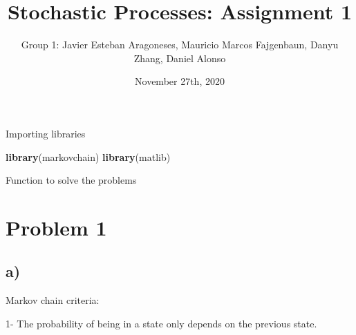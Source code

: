 \documentclass[]{article}
\title{Stochastic Processes: Assignment 1}
\author{Group 1: Javier Esteban Aragoneses, Mauricio Marcos Fajgenbaun, Danyu
Zhang, Daniel Alonso}
\date{November 27th, 2020}
\newenvironment{Shaded}{\begin{snugshade}}{\end{snugshade}}
\newcommand{\CommentTok}[1]{\textcolor[rgb]{0.56,0.35,0.01}{\textit{#1}}}
\newcommand{\ControlFlowTok}[1]{\textcolor[rgb]{0.13,0.29,0.53}{\textbf{#1}}}
\newcommand{\DecValTok}[1]{\textcolor[rgb]{0.00,0.00,0.81}{#1}}
\newcommand{\KeywordTok}[1]{\textcolor[rgb]{0.13,0.29,0.53}{\textbf{#1}}}
\newcommand{\NormalTok}[1]{#1}
\newcommand{\OperatorTok}[1]{\textcolor[rgb]{0.81,0.36,0.00}{\textbf{#1}}}
\newcommand{\StringTok}[1]{\textcolor[rgb]{0.31,0.60,0.02}{#1}}
\begin{document}
\maketitle

Importing libraries

\begin{Shaded}
\begin{Highlighting}[]
\KeywordTok{library}\NormalTok{(markovchain)}
\KeywordTok{library}\NormalTok{(matlib)}
\end{Highlighting}
\end{Shaded}

Function to solve the problems

\begin{Shaded}
\end{Shaded}

\hypertarget{problem-1}{%
\section{Problem 1}\label{problem-1}}

\hypertarget{a}{%
\subsection{a)}\label{a}}

Markov chain criteria:

1- The probability of being in a state only depends on the previous
state.
\end{document}
